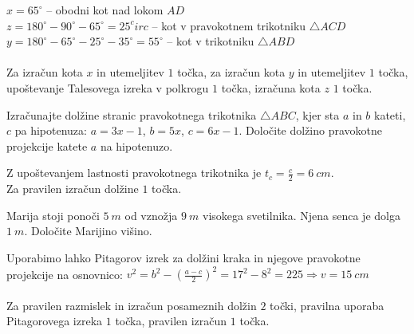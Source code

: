 \documentclass[addpoints]{exam}
\begin{document}
\begin{questions}
\begin{figure}[H]

        \end{figure}

    \begin{solution}[4cm]
        $x=65^\circ$ -- obodni kot nad lokom $AD$ \\
        $z=180^\circ-90^\circ-65^\circ=25^circ$ -- kot v pravokotnem trikotniku $\triangle ACD$ \\
        $y=180^\circ-65^\circ-25^\circ-35^\circ=55^\circ$ -- kot v trikotniku $\triangle ABD$ \\ \\
        Za izračun kota $x$ in utemeljitev $1$ točka, za izračun kota $y$ in utemeljitev $1$ točka, upoštevanje Talesovega izreka v polkrogu $1$ točka, izračuna kota $z$ $1$ točka.
    \end{solution}




    \question[4]
        Izračunajte dolžine stranic pravokotnega trikotnika $\triangle ABC$, kjer sta $a$ in $b$ kateti, $c$ pa hipotenuza:
        $a=3x-1$, $b=5x$, $c=6x-1$. Določite dolžino pravokotne projekcije katete $a$ na hipotenuzo.


        \begin{solution}[9cm]
            Z upoštevanjem lastnosti pravokotnega trikotnika je $t_c=\frac{c}{2}=6~cm$. \\
            Za pravilen izračun dolžine $1$ točka.
        \end{solution}




    \newpage

    \question[2]
        Marija stoji ponoči $5~m$ od vznožja $9~m$ visokega svetilnika. Njena senca je dolga $1~m$.
        Določite Marijino višino.


    \begin{solution}[11cm]
        Uporabimo lahko Pitagorov izrek za dolžini kraka in njegove pravokotne projekcije na osnovnico: $v^2=b^2-\left(\frac{a-c}{2}\right)^2=17^2-8^2=225 \Rightarrow v=15~cm$ \\ \\
        Za pravilen razmislek in izračun posameznih dolžin $2$ točki, pravilna uporaba Pitagorovega izreka $1$ točka, pravilen izračun $1$ točka.
    \end{solution}




\end{questions}
\end{document}
